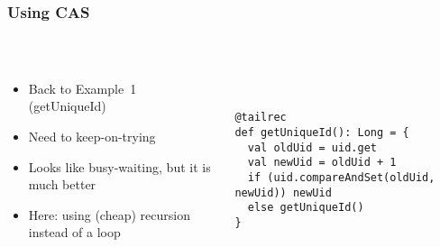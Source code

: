 \documentclass[aspectratio=169]{beamer}
\begin{document}
\begin{frame}[fragile]\frametitle{Using CAS}
~\\[-8mm]
\begin{columns}
\begin{column}{0.48\textwidth}
\begin{itemize}
  \item Back to Example~1 (getUniqueId)
  \item Need to keep-on-trying
  \item Looks like busy-waiting, but it is much better
  \item Here: using (cheap) recursion instead of a loop
\end{itemize}
\end{column}
\begin{column}{0.54\textwidth}
~\\
\begin{lstlisting}[emph={execute,sleep,log,compareAndSet,synchronized}]
@tailrec
def getUniqueId(): Long = {
  val oldUid = uid.get
  val newUid = oldUid + 1
  if (uid.compareAndSet(oldUid, newUid)) newUid
  else getUniqueId()
}\end{lstlisting}
\end{column}
\end{columns}
\end{frame}
\end{document}
